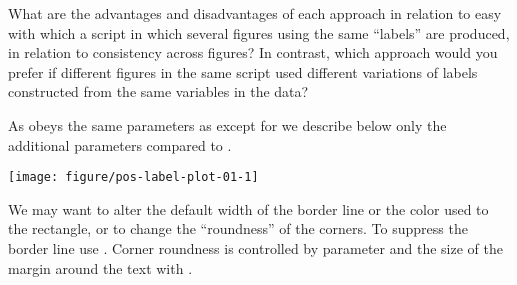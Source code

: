 \documentclass[krantz2]{krantz}\usepackage{knitr}%
\begin{document}
\begin{playground}
What are the advantages and disadvantages of each approach in relation to easy with which a script in which several figures using the same ``labels'' are produced, in relation to consistency across figures? In contrast, which approach would you prefer if different figures in the same script used different variations of labels constructed from the same variables in the data?
\end{playground}

As  obeys the same parameters as  except for  we describe below only the additional parameters compared to .\label{start:plot:label}

\begin{knitrout}\footnotesize
{}\color{fgcolor}\begin{kframe}
\begin{alltt}
 \hlkwb{<-}
  \hlstd{(} \hlstd{=} \hlopt{:}\hlstd{,}  \hlstd{=} \hlstd{(}\hlstd{,} \hlstd{),}
              \hlstd{= letters[}\hlopt{:}\hlstd{])}
    \hlopt{+}
  \hlstd{(} \hlstd{=} \hlopt{-}\hlstd{)} \hlopt{+}
  \hlstd{()}
\end{alltt}
\end{kframe}

{\centering \texttt{[image: figure/pos-label-plot-01-1]} 

}



\end{knitrout}

We may want to alter the default width of the border line or the color used to  the rectangle, or to change the ``roundness'' of the corners. To suppress the border line use . Corner roundness is controlled by parameter  and the size of the margin around the text with .
\end{document}
